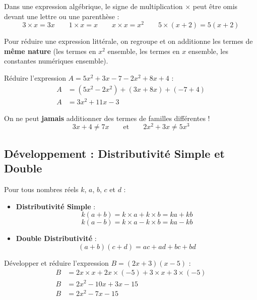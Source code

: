 \begin{cadredef}
Dans une expression algébrique, le signe de multiplication $\times$ peut être omis devant une lettre ou une parenthèse :
\[ 3 \times x = 3x \qquad 1 \times x = x \qquad x \times x = x^2 \qquad 5 \times (x + 2) = 5(x + 2) \]
\end{cadredef}

\begin{cadremethode}
Pour réduire une expression littérale, on regroupe et on additionne les termes de \textbf{même nature} (les termes en $x^2$ ensemble, les termes en $x$ ensemble, les constantes numériques ensemble).
\end{cadremethode}

\begin{cadreexemple}
Réduire l'expression $A = 5x^2 + 3x - 7 - 2x^2 + 8x + 4$ :
\begin{align*}
    A &= (5x^2 - 2x^2) + (3x + 8x) + (-7 + 4) \\
    A &= 3x^2 + 11x - 3
\end{align*}
\end{cadreexemple}

\begin{cadrepiege}
On ne peut \textbf{jamais} additionner des termes de familles différentes !
\[ 3x + 4 \neq 7x \qquad\text{et}\qquad 2x^2 + 3x \neq 5x^3 \]
\end{cadrepiege}

\subsection{Développement : Distributivité Simple et Double}

\begin{cadreprop}
Pour tous nombres réels $k$, $a$, $b$, $c$ et $d$ :
\begin{itemize}
    \item \textbf{Distributivité Simple} :
    \[ k(a + b) = k \times a + k \times b = ka + kb \]
    \[ k(a - b) = k \times a - k \times b = ka - kb \]
    \item \textbf{Double Distributivité} :
    \[ (a + b)(c + d) = ac + ad + bc + bd \]
\end{itemize}
\end{cadreprop}

\begin{cadreexemple}
Développer et réduire l'expression $B = (2x + 3)(x - 5)$ :
\begin{align*}
    B &= 2x \times x + 2x \times (-5) + 3 \times x + 3 \times (-5) \\
    B &= 2x^2 - 10x + 3x - 15 \\
    B &= 2x^2 - 7x - 15
\end{align*}
\end{cadreexemple}

